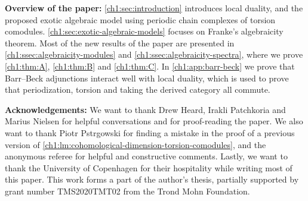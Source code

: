 \textbf{Overview of the paper:} \cref{ch1:sec:introduction} introduces local duality, and the proposed exotic algebraic model using periodic chain complexes of torsion comodules. \cref{ch1:sec:exotic-algebraic-models} focuses on Franke's algebraicity theorem. Most of the new results of the paper are presented in \cref{ch1:ssec:algebraicity-modules} and \cref{ch1:ssec:algebraicity-spectra}, where we prove \cref{ch1:thm:A}, \cref{ch1:thm:B} and \cref{ch1:thm:C}. In \cref{ch1:app:barr-beck} we prove that Barr--Beck adjunctions interact well with local duality, which is used to prove that periodization, torsion and taking the derived category all commute. 


\textbf{Acknowledgements:} We want to thank Drew Heard, Irakli Patchkoria and Marius Nielsen for helpful conversations and for proof-reading the paper. We also want to thank Piotr Pstr\a{}gowski for finding a mistake in the proof of a previous version of \cref{ch1:lm:cohomological-dimension-torsion-comodules}, and the anonymous referee for helpful and constructive comments. Lastly, we want to thank the University of Copenhagen for their hospitality while writing most of this paper. This work forms a part of the author's thesis, partially supported by grant number TMS2020TMT02 from the Trond Mohn Foundation. 